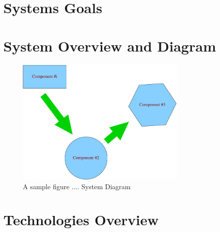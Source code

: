 \section{Systems Goals}

\section{System Overview and Diagram}

\begin{figure}[tbh]
\begin{center}
\includegraphics[width=0.75\textwidth]{./diagram}
\end{center}
\caption{A sample figure .... System Diagram \label{systemdiagram}}
\end{figure}

\section{Technologies Overview}

